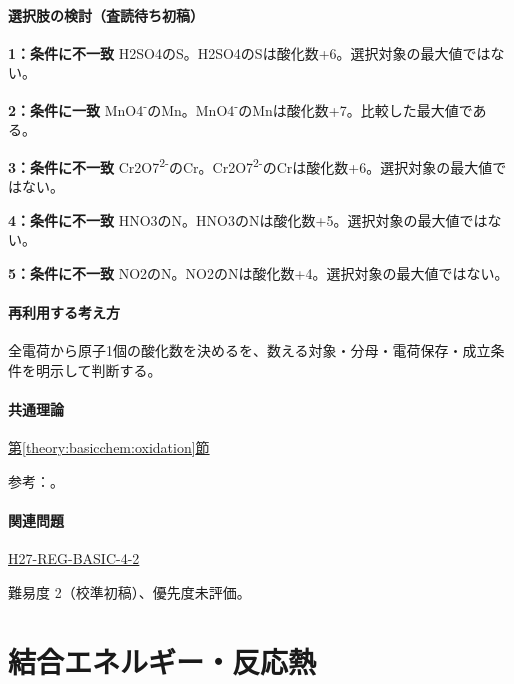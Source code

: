 \paragraph{選択肢の検討（査読待ち初稿）}\mbox{}\par

\noindent\textbf{1：条件に不一致} H2SO4のS。H2SO4のSは酸化数+6。選択対象の最大値ではない。\par

\noindent\textbf{2：条件に一致} MnO4\textsuperscript{-}のMn。MnO4\textsuperscript{-}のMnは酸化数+7。比較した最大値である。\par

\noindent\textbf{3：条件に不一致} Cr2O7\textsuperscript{2-}のCr。Cr2O7\textsuperscript{2-}のCrは酸化数+6。選択対象の最大値ではない。\par

\noindent\textbf{4：条件に不一致} HNO3のN。HNO3のNは酸化数+5。選択対象の最大値ではない。\par

\noindent\textbf{5：条件に不一致} NO2のN。NO2のNは酸化数+4。選択対象の最大値ではない。\par

\paragraph{再利用する考え方} 全電荷から原子1個の酸化数を決めるを、数える対象・分母・電荷保存・成立条件を明示して判断する。

\paragraph{共通理論} \hyperref[theory:basicchem:oxidation]{第\ref*{theory:basicchem:oxidation}節}

\par 参考：\cite{iupac_oxidation_state}。

\paragraph{関連問題} \hyperref[q:h27-reg-basic-4-2]{H27-REG-BASIC-4-2}

\par 難易度 2（校準初稿）、優先度未評価。

\section{結合エネルギー・反応熱}

